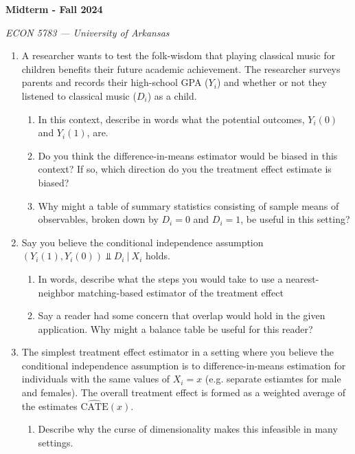 \documentclass[12pt]{article}
\begin{document}
\begin{center}
  {\Huge\bf Midterm - Fall 2024}
  
  \smallskip
  {\large\it ECON 5783 — University of Arkansas}
\end{center}

\medskip
\begin{enumerate}

  \item A researcher wants to test the folk-wisdom that playing classical music for children benefits their future academic achievement. The researcher surveys parents and records their high-school GPA ($Y_i$) and whether or not they listened to classical music ($D_i$) as a child.
  \begin{enumerate}
    \item In this context, describe in words what the potential outcomes, $Y_i(0)$ and $Y_i(1)$, are.
    
    \item Do you think the difference-in-means estimator would be biased in this context? If so, which direction do you the treatment effect estimate is biased?
    
    \item Why might a table of summary statistics consisting of sample means of observables, broken down by $D_i = 0$ and $D_i = 1$, be useful in this setting?
  \end{enumerate}

  \medskip
  \item Say you believe the conditional independence assumption $(Y_i(1), Y_i(0)) \Perp D_i \ \vert \ X_i$ holds. 
  \begin{enumerate}
    \item In words, describe what the steps you would take to use a nearest-neighbor matching-based estimator of the treatment effect
    
    \item Say a reader had some concern that overlap would hold in the given application. Why might a balance table be useful for this reader? 
  \end{enumerate}
  
  \medskip
  \item The simplest treatment effect estimator in a setting where you believe the conditional independence assumption is to difference-in-means estimation for individuals with the same values of $X_i = x$ (e.g. separate estiamtes for male and females). The overall treatment effect is formed as a weighted average of the estimates $\widehat{\text{CATE}}(x)$.
  \begin{enumerate}
    \item Describe why the curse of dimensionality makes this infeasible in many settings.
  \end{enumerate}
\end{enumerate}
\end{document}
